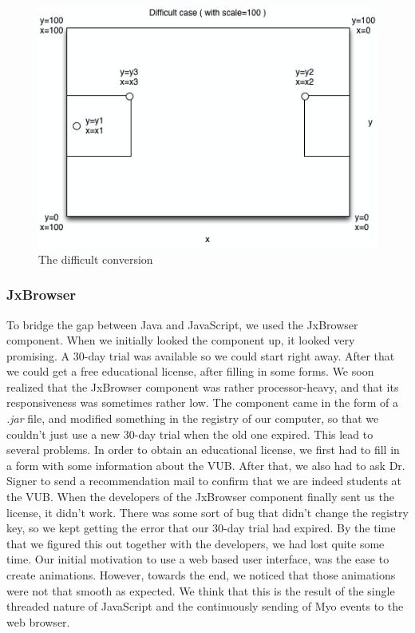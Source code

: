 \documentclass{article}
\begin{document}
\begin{figure}[!ht]
  \centering
      \centerline{\includegraphics[width=1\textwidth]{Images/diff-conversion.png}}
  \caption{The difficult conversion}
	\label{diffconv}
\end{figure}


\subsubsection{JxBrowser}
To bridge the gap between Java and JavaScript, we used the JxBrowser component. When we initially looked the component up, it looked very promising. A 30-day trial was available so we could start right away. After that we could get a free educational license, after filling in some forms. We soon realized that the JxBrowser component was rather processor-heavy, and that its responsiveness was sometimes rather low. The component came in the form of a \textit{.jar} file, and modified something in the registry of our computer, so that we couldn't just use a new 30-day trial when the old one expired. This lead to several problems. In order to obtain an educational license, we first had to fill in a form with some information about the VUB. After that, we also had to ask Dr. Signer to send a recommendation mail to confirm that we are indeed students at the VUB. When the developers of the JxBrowser component finally sent us the license, it didn't work. There was some sort of bug that didn't change the registry key, so we kept getting the error that our 30-day trial had expired. By the time that we figured this out together with the developers, we had lost quite some time.
Our initial motivation to use a web based user interface, was the ease to create animations. However, towards the end, we noticed that those animations were not that smooth as expected. We think that this is the result of the single threaded nature of JavaScript and the continuously sending of Myo events to the web browser.
\end{document}
